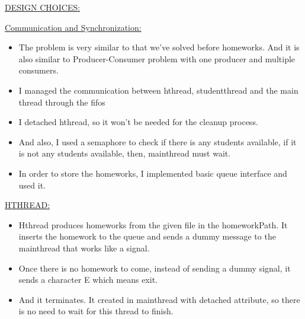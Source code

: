 \documentclass[12pt]{report}
\renewcommand{\_}{\kern-1.5pt\textunderscore\kern-1.5pt}
\begin{document}
\vspace{\baselineskip}

\vspace{\baselineskip}

\vspace{\baselineskip}

\vspace{\baselineskip}
\begin{justify}
{\fontsize{16pt}{19.2pt}\selectfont \uline{DESIGN CHOICES:}}
\end{justify}
\begin{justify}
{\fontsize{14pt}{16.8pt}\selectfont \uline{Communication and Synchronization:}}
\end{justify}
\begin{itemize}
	\item The problem is very similar to that we’ve solved before homeworks. And it is also similar to Producer-Consumer problem with one producer and multiple consumers.
	\item I managed the communication between h\_thread, student\_thread and the main thread through the fifos
	\item I detached h\_thread, so it won’t be needed for the cleanup process.
	\item And also, I used a semaphore to check if there is any students available, if it is not any students available, then, main\_thread must wait.
	\item In order to store the homeworks, I implemented basic queue interface and used it.
\end{itemize}
\begin{justify}
{\fontsize{14pt}{16.8pt}\selectfont \uline{H\_THREAD:}} 
\end{justify}
\begin{itemize}
	\item H\_thread produces homeworks from the given file in the homeworkPath. It inserts the homework to the queue and sends a dummy message to the main\_thread that works like a signal.
	\item Once there is no homework to come, instead of sending a dummy signal, it sends a character E which means exit.
	\item And it terminates. It created in main\_thread with detached attribute, so there is no need to wait for this thread to finish.
\end{itemize}
\end{document}
